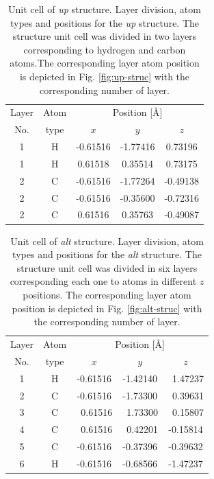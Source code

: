 \documentclass[prb,11pt,tightenlines,twocolumn,aps]{revtex4-1}
\begin{document}
\begin{table}[t]
\center
\begin{tabular}{ccccc}\\
\hline
\quad Layer \quad & \quad Atom \qquad & \multicolumn{3}{c}{Position [\AA]} \\
\cline{3-5}
\quad No.   \quad & \quad type \qquad & $x$ & $y$ & $z$  \\
\hline
1 & H & -0.61516 & -1.77416 &  0.73196 \\
1 & H &  0.61518 &  0.35514 &  0.73175 \\
2 & C & -0.61516 & -1.77264 & -0.49138 \\
2 & C & -0.61516 & -0.35600 & -0.72316 \\
2 & C &  0.61516 &  0.35763 & -0.49087 \\
\hline
\end{tabular}

\caption{Unit cell of \emph{up} structure. Layer division, atom types and
positions for the \emph{up} structure. The structure unit cell was divided in
two layers corresponding to hydrogen and carbon atoms.The corresponding layer
atom position is depicted in Fig. \ref{fig:up-struc} with the corresponding
number of layer.}
\label{tab:up-unitcell}
\end{table}
% 
% 
\begin{table}[t]
\center
\begin{tabular}{ccccc}\\
\hline
\quad Layer \quad & \quad Atom \qquad & \multicolumn{3}{c}{Position [\AA]} \\
\cline{3-5}
\quad No.   \quad & \quad type \qquad & $x$ & $y$ & $z$  \\
\hline
1 & H &  -0.61516 &  -1.42140 & \ 1.47237 \\
2 & C &  -0.61516 &  -1.73300 & \ 0.39631 \\
3 & C & \ 0.61516 & \ 1.73300 & \ 0.15807 \\
4 & C & \ 0.61516 & \ 0.42201 &  -0.15814 \\
5 & C &  -0.61516 &  -0.37396 &  -0.39632 \\
6 & H &  -0.61516 &  -0.68566 &  -1.47237 \\
\hline
\end{tabular}

\caption{Unit cell of \emph{alt} structure. Layer division, atom types and
positions for the \emph{alt} structure. The structure unit cell was divided in
six layers corresponding each one to atoms in different $z$ positions. The
corresponding layer atom position is depicted in Fig. \ref{fig:alt-struc} with
the corresponding number of layer.}
\label{tab:alt-unitcell}
\end{table}
\end{document}
